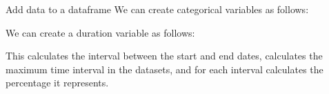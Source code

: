 \documentclass[
  11pt,
  ignorenonframetext,
  svgnames, handout, t]{beamer}
\newenvironment{Shaded}{\begin{snugshade}}{\end{snugshade}}
\newcommand{\DecValTok}[1]{\textcolor[rgb]{0.00,0.00,0.81}{#1}}
\newcommand{\FunctionTok}[1]{\textcolor[rgb]{0.00,0.00,0.00}{#1}}
\newcommand{\NormalTok}[1]{#1}
\newcommand{\OtherTok}[1]{\textcolor[rgb]{0.56,0.35,0.01}{#1}}
\newcommand{\SpecialCharTok}[1]{\textcolor[rgb]{0.00,0.00,0.00}{#1}}
\begin{document}
\begin{frame}[fragile]{Add data to a dataframe}
\protect\hypertarget{add-data-to-a-dataframe}{}
We can create categorical variables as follows:

\footnotesize

\begin{Shaded}
\end{Shaded}

\normalsize

We can create a duration variable as follows:

\footnotesize

\begin{Shaded}
\end{Shaded}

\normalsize This calculates the interval between the start and end
dates, calculates the maximum time interval in the datasets, and for
each interval calculates the percentage it represents.

\footnotesize


\end{frame}
\end{document}
